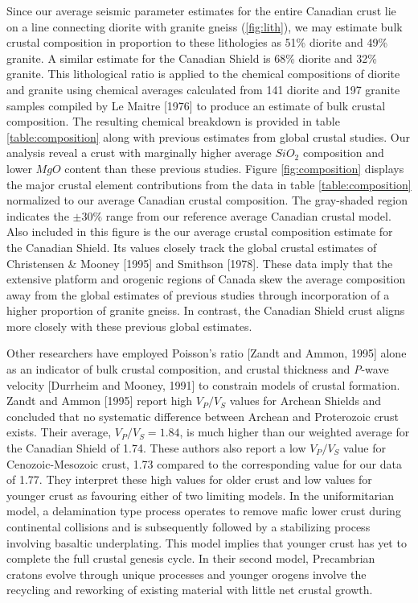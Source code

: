 \documentclass[draft, 12pt]{article}
\begin{document}
Since our average seismic parameter estimates for the entire Canadian crust lie on a line connecting diorite with granite gneiss (\ref{fig:lith}), we may estimate bulk crustal composition in proportion to these lithologies as 51\% diorite and 49\% granite. A similar estimate for the Canadian Shield is 68\% diorite and 32\% granite. This lithological ratio is applied to the chemical compositions of diorite and granite using chemical averages calculated from 141 diorite and 197 granite samples compiled by Le Maitre [1976] to produce an estimate of bulk crustal composition. The resulting chemical breakdown is provided in table \ref{table:composition} along with previous estimates from global crustal studies. Our analysis reveal a crust with marginally higher average $SiO_2$ composition and lower $MgO$ content than these previous studies. Figure \ref{fig:composition} displays the major crustal element contributions from the data in table \ref{table:composition} normalized to our average Canadian crustal composition. The gray-shaded region indicates the $\pm 30\%$ range from our reference average Canadian crustal model.  Also included in this figure is the our average crustal composition estimate for the Canadian Shield. Its values closely track the global crustal estimates of Christensen \& Mooney [1995] and Smithson [1978]. These data imply that the extensive platform and orogenic regions of Canada skew the average composition away from the global estimates of previous studies through incorporation of a higher proportion of granite gneiss. In contrast, the Canadian Shield crust aligns more closely with these previous global estimates.

Other researchers have employed Poisson's ratio [Zandt and Ammon, 1995] alone as an indicator of bulk crustal composition, and crustal thickness and {\it P}-wave velocity [Durrheim and Mooney, 1991] to constrain models of crustal formation. Zandt and Ammon [1995] report high $V_P/V_S$ values for Archean Shields and concluded that no systematic difference between Archean and Proterozoic crust exists. Their average, $V_P/V_S=1.84$, is much higher than our weighted average for the Canadian Shield of 1.74. These authors also report a low $V_P/V_S$ value for Cenozoic-Mesozoic crust, 1.73 compared to the corresponding value for our data of 1.77. They interpret these high values for older crust and low values for younger crust as favouring either of two limiting models. In the uniformitarian model, a delamination type process operates to remove mafic lower crust during continental collisions and is subsequently followed by a stabilizing process involving basaltic underplating. This model implies that younger crust has yet to complete the full crustal genesis cycle. In their second model, Precambrian cratons evolve through unique processes and younger orogens involve the recycling and reworking of existing material with little net crustal growth.
\end{document}
